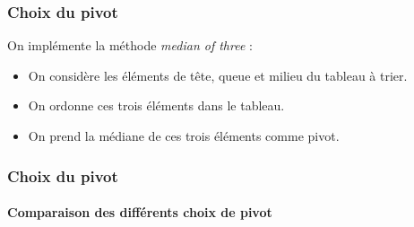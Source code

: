 \documentclass{beamer}
\begin{document}
			\begin{frame}
				\frametitle{Choix du pivot}

				On implémente la méthode \emph{median of three} : \pause 
				
				\begin{itemize}
					\item On considère les éléments de tête, queue et
						milieu du tableau à trier. \pause
					\item On ordonne ces trois éléments dans le tableau.
						\pause
					\item On prend la médiane de ces trois éléments comme
						pivot.
				\end{itemize}

			\end{frame}
			\begin{frame}
				\frametitle{Choix du pivot}
				\framesubtitle{Comparaison des différents choix de pivot}

				
			\end{frame}
\end{document}
